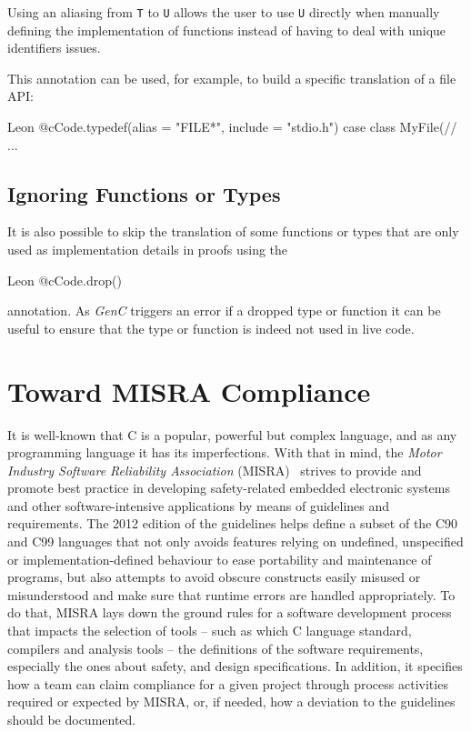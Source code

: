 \documentclass[a4paper,twoside]{article}
\newcommand{\InlineS}[1]{\lstinline[language=Leon]|#1|}
\let\oldsection\section
\renewcommand\section{\cleardoublepage\oldsection}
\newcommand{\TODO}[1]{\textcolor{YellowOrange}{(#1)}} %
\newcommand{\GenC}{\emph{GenC}\xspace}
\begin{document}
Using an aliasing from \InlineS{T} to \InlineS{U} allows the user to use
\InlineS{U} directly when manually defining the implementation of functions
instead of having to deal with unique identifiers issues.

This annotation can be used, for example, to build a specific translation of
a file API:

\begin{ShortCode}{Leon}
@cCode.typedef(alias = "FILE*", include = "stdio.h")
case class MyFile(// ...
\end{ShortCode}


\subsection{Ignoring Functions or Types}

It is also possible to skip the translation of some functions or types that are
only used as implementation details in proofs using the
\begin{ShortCode}{Leon}
@cCode.drop()
\end{ShortCode}
annotation. As \GenC triggers an error if a dropped type or function it can be useful to
ensure that the type or function is indeed not used in live code.





\section{Toward MISRA Compliance}
\label{MISRA}

It is well-known that C is a popular, powerful but complex language, and as any
programming language it has its imperfections. With that in mind, the
\emph{Motor Industry Software Reliability Association} (MISRA)~\cite{misra}
strives to provide and promote best practice in developing safety-related
embedded electronic systems and other software-intensive applications by means
of guidelines and requirements. The 2012 edition of the guidelines helps define
a subset of the C90 and C99 languages that not only avoids features relying on
undefined, unspecified or implementation-defined behaviour to ease portability
and maintenance of programs, but also attempts to avoid obscure constructs
easily misused or misunderstood and make sure that runtime errors are handled
appropriately. To do that, MISRA lays down the ground rules for a software
development process that impacts the selection of tools -- such as which C
language standard, compilers and analysis tools -- the definitions of the
software requirements, especially the ones about safety, and design
specifications. In addition, it specifies how a team can claim compliance for a
given project through process activities required or expected by MISRA, or, if
needed, how a deviation to the guidelines should be documented.
\end{document}
